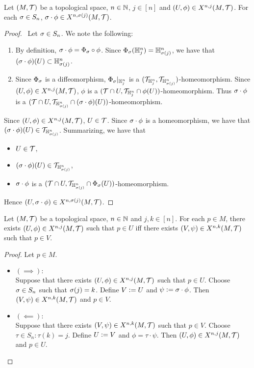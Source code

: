 \documentclass{book}
\begin{document}
	\begin{ex}
		Let $(M, \mathcal{T})$ be a topological space, $n \in \mathbb{N}$, $j \in [n]$ and $(U, \phi) \in X^{n,j}(M, \mathcal{T})$. For each $\sigma \in S_n$, $\sigma \cdot \phi \in X^{n, \sigma(j)}(M, \mathcal{T})$. 
	\end{ex}

	\begin{proof}\
		Let $\sigma \in S_n$. We note the following:
		\begin{enumerate}
			\item By definition, $\sigma \cdot \phi = \Phi_{\sigma} \circ \phi$. Since $\Phi_{\sigma}(\mathbb{H}^n_j) = \mathbb{H}^n_{\sigma(j)}$, we have that $(\sigma \cdot \phi)(U) \subset \mathbb{H}^n_{\sigma(j)}$. 
			\item Since $\Phi_{\sigma}$ is a diffeomorphism, $\Phi_{\sigma}|_{\mathbb{H}^n_j}$ is a $(\mathcal{T}_{\mathbb{H}^n_j}, \mathcal{T}_{\mathbb{H}^n_{\sigma(j)}} )$-homeomorphism. Since $(U, \phi) \in X^{n,j}(M, \mathcal{T})$, $\phi$ is a $(\mathcal{T} \cap U, \mathcal{T}_{\mathbb{H}^n_j} \cap \phi(U))$-homeomorphism. Thus $\sigma \cdot \phi$ is a $(\mathcal{T} \cap U, \mathcal{T}_{\mathbb{H}^n_{\sigma(j)}} \cap (\sigma \cdot \phi)(U))$-homeomorphism.
		\end{enumerate}
		Since $(U, \phi) \in X^{n,j}(M, \mathcal{T})$, $U \in \mathcal{T}$. Since $\sigma \cdot \phi$ is a homeomorphism, we have that $(\sigma \cdot \phi)(U) \in \mathcal{T}_{\mathbb{H}^n_{\sigma(j)}}$. Summarizing, we have that
		\begin{itemize}
			\item $U \in \mathcal{T}$,
			\item $(\sigma \cdot \phi)(U) \in \mathcal{T}_{\mathbb{H}^n_{\sigma(j)}}$,
			\item $\sigma \cdot \phi$ is a $(\mathcal{T} \cap U, \mathcal{T}_{\mathbb{H}^n_{\sigma(j)}} \cap \Phi_{\sigma}(U))$-homeomorphism.
		\end{itemize}
		Hence $(U, \sigma \cdot \phi) \in X^{n, \sigma(j)}(M, \mathcal{T})$.
	\end{proof}

	\begin{ex}
		Let $(M, \mathcal{T})$ be a topological space, $n \in \mathbb{N}$ and $j,k \in [n]$. For each $p \in M$, there exists $(U, \phi) \in X^{n,j}(M, \mathcal{T})$ such that $p \in U$ iff there exists $(V, \psi) \in X^{n, k}(M, \mathcal{T})$ such that $p \in V$. 
	\end{ex}
	
	\begin{proof}
		Let $p \in M$. 
		\begin{itemize}
			\item $(\implies):$ \\
			Suppose that there exists $(U, \phi) \in X^{n,j}(M, \mathcal{T})$ such that $p \in U$. Choose $\sigma \in S_n$ such that $\sigma(j) = k$. Define $V \vcentcolon= U$ and $\psi \vcentcolon= \sigma \cdot \phi$. Then $(V, \psi) \in X^{n, k}(M, \mathcal{T})$ and $p \in V$.  
			\item $(\impliedby):$ \\
			Suppose that there exists $(V, \psi) \in X^{n, k}(M, \mathcal{T})$ such that $p \in V$. Choose $\tau \in S_n: \tau(k) = j$. Define $U \vcentcolon= V$ and $\phi = \tau \cdot \psi$. Then $(U, \phi) \in X^{n,j}(M, \mathcal{T})$ and $p \in U$. 
		\end{itemize}
	\end{proof}
\end{document}
